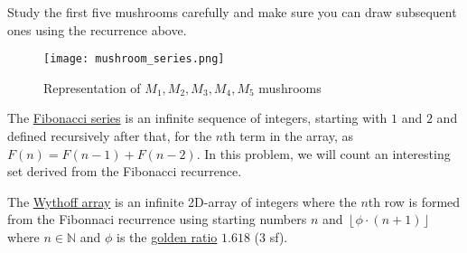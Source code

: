\documentclass[addpoints]{exam}
\begin{document}
\begin{questions}
Study the first five mushrooms carefully and make sure you can draw subsequent ones using the recurrence above.

\begin{figure}[h]
  \centering
  \texttt{[image: mushroom\_series.png]}
  \caption{Representation of $M_1,M_2,M_3,M_4,M_5$ mushrooms}
  \label{fig:mushroom_anatomy}
\end{figure}


\question
    The \href{https://en.wikipedia.org/wiki/Fibonacci_number}{Fibonacci series} is an infinite sequence of integers, starting with $1$ and $2$ and defined recursively after that, for the $n$th term in the array, as $F(n) = F(n-1) + F(n-2)$. In this problem, we will count an interesting set derived from the Fibonacci recurrence.
    
The \href{http://www.maths.surrey.ac.uk/hosted-sites/R.Knott/Fibonacci/fibGen.html#section6.2}{Wythoff array} is an infinite 2D-array of integers where the $n$th row is formed from the Fibonnaci recurrence using starting numbers $n$ and $\left \lfloor{\phi\cdot (n+1)}\right \rfloor$ where $n \in \mathbb{N}$ and $\phi$ is the \href{https://en.wikipedia.org/wiki/Golden_ratio}{golden ratio} $1.618$ (3 sf).


\end{questions}
\end{document}
